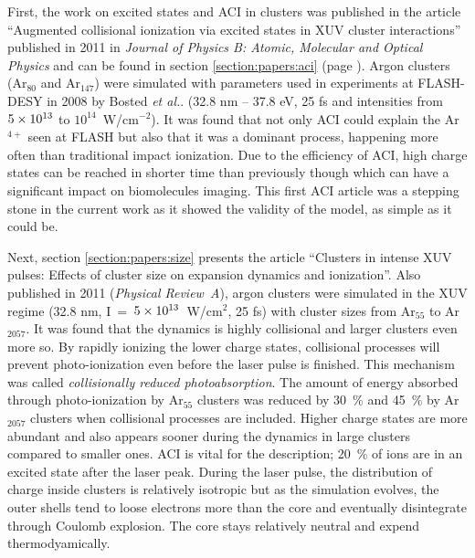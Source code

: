 
First, the work on excited states and ACI in clusters was published in the article
``Augmented collisional ionization via excited states in XUV cluster
interactions'' published in 2011 in \textit{Journal of Physics B: Atomic,
Molecular and Optical Physics}\cite{Ackad2011a} and can be found in section
\ref{section:papers:aci} (page \pageref{section:papers:aci}). Argon clusters
(Ar$_{80}$ and Ar$_{147}$) were simulated with parameters used in experiments
at FLASH-DESY in 2008 by Bosted \textit{et al.}\cite{Bostedt2008}.
(32.8 nm -- 37.8 eV, 25 fs and intensities from $\ten{5}{13}$ to
$10^{14}$~W/cm$^{-2}$). It was found that not only ACI could explain the
Ar$^{4+}$ seen at FLASH but also that it
was a dominant process, happening more often than traditional impact ionization.
Due to the efficiency of ACI, high charge states can be reached in shorter time
than previously though which can have a significant impact on biomolecules
imaging. This first ACI article was a stepping stone in the current work as it
showed the validity of the model, as simple as it could be.



Next, section \ref{section:papers:size} presents the article ``Clusters in
intense XUV pulses: Effects of cluster size on expansion dynamics and
ionization''. Also published in 2011 (\textit{Physical Review~A}\cite{Ackad2011b}),
argon clusters were simulated in the XUV regime (32.8 nm,
I~=~$\ten{5}{13}$~W/cm$^{2}$, 25 fs) with cluster sizes from Ar$_{55}$ to
Ar$_{2057}$. It was found that the dynamics is highly collisional and
larger clusters even more so. By rapidly ionizing the lower charge states,
collisional processes will prevent photo-ionization even before the laser pulse
is finished. This mechanism was called \textit{collisionally reduced photoabsorption}.
The amount of energy absorbed through photo-ionization by Ar$_{55}$ clusters was
reduced by 30~\% and 45~\% by Ar$_{2057}$ clusters when collisional processes
are included.
Higher charge states are more abundant and also appears sooner during the
dynamics in large clusters compared to smaller ones. ACI is vital for the
description; 20~\% of ions are in an excited state after the laser peak.
During the laser pulse, the distribution of charge inside clusters is
relatively isotropic but as the simulation evolves, the outer shells tend to
loose electrons more than the core and eventually disintegrate through Coulomb
explosion.
The core stays relatively neutral and expend thermodyamically.

